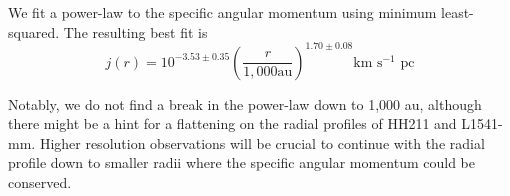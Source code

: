 We fit a power-law to the specific angular momentum using minimum least-squared. 
The resulting best fit is 
\begin{equation}
j(r) = 10^{-3.53\pm 0.35}\left( \frac{r}{1,000 \textrm{au}}\right)^{1.70\pm0.08} \textrm{km s$^{-1}$ pc}
\end{equation}

Notably, we do not find a break in the power-law down to 1,000 au, although there might be a hint 
for a flattening on the radial profiles of HH211 and L1541-mm. 
Higher resolution observations will be crucial to continue with the radial profile down to 
smaller radii where the specific angular momentum could be conserved.